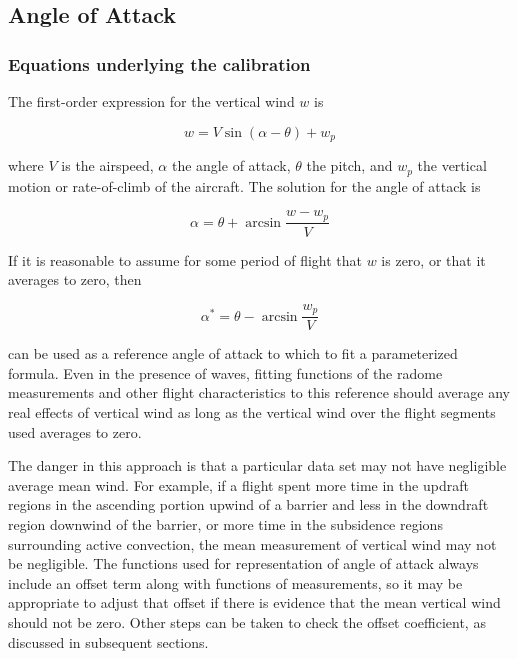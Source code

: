 \documentclass[12pt,twoside,english]{article}\usepackage[]{graphicx}\usepackage[]{color}
\let\OrgIndex\index
\renewcommand*{\index}[1]{\OrgIndex{#1}}
\begin{document}





\subsection{Angle of Attack\label{sub:Calibration-AOA}}


\subsubsection{Equations underlying the calibration}

The first-order expression for the vertical wind $w$ is 

\begin{equation}
w=V\sin(\alpha-\theta)+w_{p}\label{eq:VWind} 
\end{equation}


where $V$ is the airspeed, $\alpha$ the angle of attack, $\theta$ the pitch, and $w_{p}$ the vertical motion or rate-of-climb of the aircraft. The solution for the angle of attack is 

\begin{equation}
\alpha=\theta+\arcsin\frac{w-w_{p}}{V}\label{eq:SolvedForAOA} 
\end{equation}


If it is reasonable to assume for some period of flight that $w$ is zero, or that it averages to zero, then 

\begin{equation}
\alpha^{*}=\theta-\arcsin\frac{w_{p}}{V}\label{eq:alphaWithwZero} 
\end{equation}


can be used as a reference angle of attack to which to fit a parameterized formula. Even in the presence of waves, fitting functions of the radome measurements and other flight characteristics to this reference should average any real effects of vertical wind as long as the vertical wind over the flight segments used averages to zero. 

The danger in this approach is that a particular data set may not have negligible average mean wind. For example, if a flight spent more time in the updraft regions in the ascending portion upwind of a barrier and less in the downdraft region downwind of the barrier, or more time in the subsidence regions surrounding active convection, the mean measurement of vertical wind may not be negligible. The functions used for representation of angle of attack always include an offset term along with functions of measurements, so it may be appropriate to adjust that offset if there is evidence that the mean vertical wind should not be zero. Other steps can be taken to check the offset coefficient, as discussed in subsequent sections. 
\end{document}

